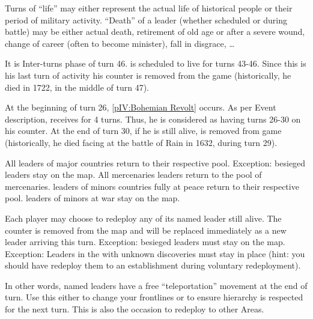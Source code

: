 \begin{designnote}
  Turns of ``life'' may either represent the actual life of historical people
  or their period of military activity. ``Death'' of a leader (whether
  scheduled or during battle) may be either actual death, retirement of old
  age or after a severe wound, change of career (often to become minister),
  fall in disgrace, \ldots
\end{designnote}

\begin{exemple}
  It is Inter-turns phase of turn 46.  is
  scheduled to live for turns 43-46. Since this is his last turn of activity
  his counter is removed from the game (historically, he died in 1722, in the
  middle of turn 47).

  \smallskip

  At the beginning of turn 26, \ref{pIV:Bohemian Revolt} occurs. As per Event
  description, \paysBaviere receives  for 4 turns. Thus,
  he is considered as having turns 26-30 on his counter. At the end of turn
  30, if he is still alive, \leaderTilly is removed from game (historically,
  he died facing  at the battle of Rain in 1632, during
  turn 29).
\end{exemple}

\aparag[Anonymous]
\bparag All \anonyme leaders of major countries return to their respective
pool.
\bparag Exception: besieged leaders stay on the map.
\bparag All mercenaries leaders return to the pool of mercenaries.
\bparag \anonyme leaders of minors countries fully at peace return to their
respective pool.
\bparag \anonyme leaders of minors at war stay on the map.

Each player may choose to redeploy any of its named leader still alive. The
counter is removed from the map and will be replaced immediately as a new
leader arriving this turn.
\bparag Exception: besieged leaders must stay on the map.
\bparag Exception: Leaders in the \ROTW with unknown discoveries must stay in
place (hint: you should have redeploy them to an establishment during
voluntary redeployment).

\begin{playtip}
  In other words, named leaders have a free ``teleportation'' movement at the
  end of turn. Use this either to change your frontlines or to ensure
  hierarchy is respected for the next turn. This is also the occasion to
  redeploy \LeaderGov to other Areas.
\end{playtip}

